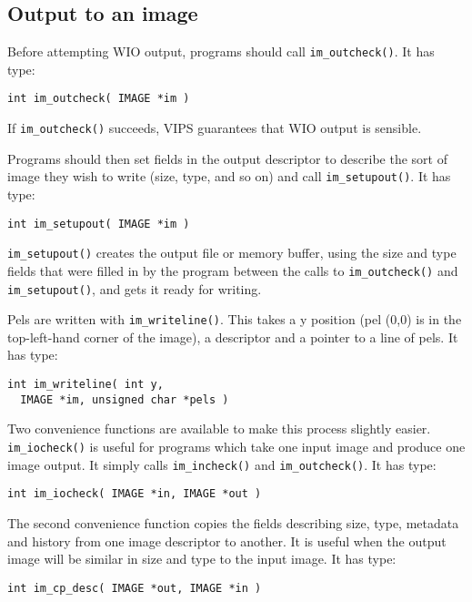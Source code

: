 \subsection{Output to an image}

Before attempting WIO output, programs should call \verb+im_outcheck()+. It
has type:

\begin{verbatim}
int im_outcheck( IMAGE *im ) 
\end{verbatim}

\noindent
If \verb+im_outcheck()+ succeeds, VIPS guarantees that WIO output is sensible.

Programs should then set fields in the output descriptor to describe
the sort of image they wish to write (size, type, and so on) and call
\verb+im_setupout()+. It has type:

\begin{verbatim}
int im_setupout( IMAGE *im ) 
\end{verbatim}

\noindent
\verb+im_setupout()+ creates the output file or memory buffer, using the
size and type fields that were filled in by the program between the calls to
\verb+im_outcheck()+ and \verb+im_setupout()+, and gets it ready for writing.

Pels are written with \verb+im_writeline()+. This takes a y position (pel
(0,0) is in the top-left-hand corner of the image), a descriptor and a
pointer to a line of pels. It has type:

\begin{verbatim}
int im_writeline( int y, 
  IMAGE *im, unsigned char *pels )
\end{verbatim}

Two convenience functions are available to make this process slightly
easier. \verb+im_iocheck()+ is useful for programs which take one input
image and produce one image output. It simply calls \verb+im_incheck()+
and \verb+im_outcheck()+. It has type:

\begin{verbatim}
int im_iocheck( IMAGE *in, IMAGE *out )  
\end{verbatim}

The second convenience function copies the fields describing size, type,
metadata and history from one image descriptor to another. It is useful when 
the output
image will be similar in size and type to the input image. It has type:

\begin{verbatim}
int im_cp_desc( IMAGE *out, IMAGE *in )
\end{verbatim}

